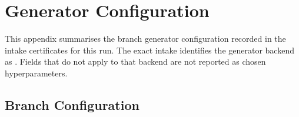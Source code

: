 \section{Generator Configuration}
This appendix summarises the branch generator configuration recorded in the intake certificates for this run. The exact intake identifies the generator backend as \texttt{\ReleaseGeneratorBackend}. Fields that do not apply to that backend are not reported as chosen hyperparameters.

\subsection{Branch Configuration}
\begin{table}[htbp]
\centering

\caption{Generator configuration and hyperparameter disposition for each branch in this synthetic audit run, derived from the intake certificates when available.}
\label{tab:generator_config_branches}
\end{table}
